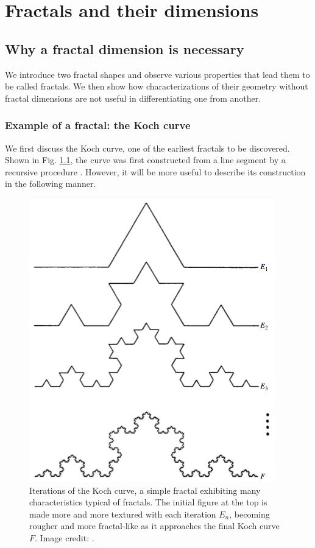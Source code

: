 
\chapter{Fractals and their dimensions} %

\label{Chapter1} %



\section{Why a fractal dimension is necessary}
We introduce two fractal shapes and observe various properties that lead them to be called fractals. We then show how characterizations of their geometry without fractal dimensions are not useful in differentiating one from another. 

\subsection{Example of a fractal: the Koch curve}\label{fractalexample}

We first discuss the Koch curve, one of the earliest fractals to be discovered. Shown in Fig. \ref{fig:kochcurve}, the curve was first constructed from a line segment by a recursive procedure \citep{Kochcurve}. However, it will be more useful to describe its construction in the following manner.

\begin{figure}[h]
\centering
\includegraphics[height=0.6\textwidth]{Chapters/Figures/Kochcurve.png} 
\caption[Koch Curve]{Iterations of the Koch curve, a simple fractal exhibiting many characteristics typical of fractals. The initial figure at the top is made more and more textured with each iteration $E_{n}$, becoming rougher and more fractal-like as it approaches the final Koch curve $F$. Image credit: \citep{fractaltextbook}. }\label{fig:kochcurve}
\end{figure}

